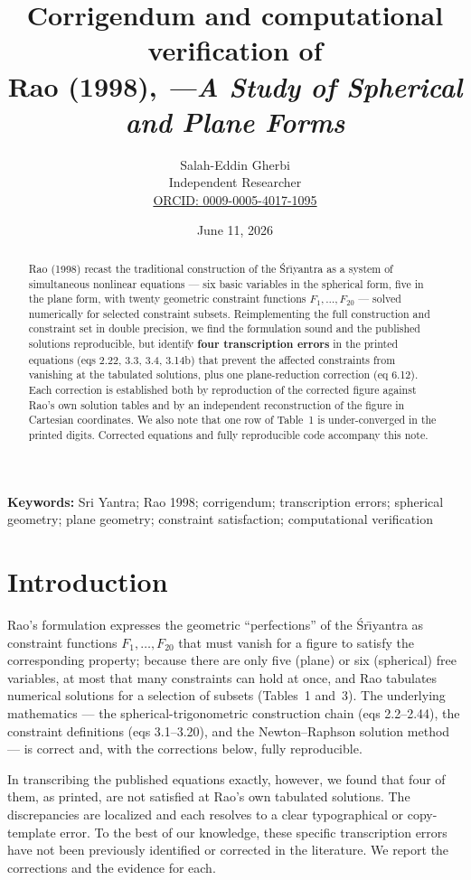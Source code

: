 \documentclass[11pt]{article}
\title{\vspace{-2em}Corrigendum and computational verification of\\
Rao (1998), \emph{\Sri{}---A Study of Spherical and Plane Forms}}
\author{Salah-Eddin Gherbi\\[2pt]\small Independent Researcher\\\small \href{https://orcid.org/0009-0005-4017-1095}{ORCID: 0009-0005-4017-1095}}
\date{June 11, 2026}
\newcommand{\Sri}{\'{S}r\={\i}yantra}
\providecommand{\keywords}[1]{\par\noindent\textbf{Keywords:} #1\par}
\begin{document}
\maketitle

\begin{abstract}
\noindent Rao (1998) recast the traditional construction of the \Sri{} as a system of simultaneous nonlinear equations --- six basic variables in the spherical form, five in the plane form, with twenty geometric constraint functions $F_1,\dots,F_{20}$ --- solved numerically for selected constraint subsets. Reimplementing the full construction and constraint set in double precision, we find the formulation sound and the published solutions reproducible, but identify \textbf{four transcription errors} in the printed equations (eqs 2.22, 3.3, 3.4, 3.14b) that prevent the affected constraints from vanishing at the tabulated solutions, plus one plane-reduction correction (eq 6.12). Each correction is established both by reproduction of the corrected figure against Rao's own solution tables and by an independent reconstruction of the figure in Cartesian coordinates. We also note that one row of Table~1 is under-converged in the printed digits. Corrected equations and fully reproducible code accompany this note.
\end{abstract}

\keywords{Sri Yantra; Rao 1998; corrigendum; transcription errors; spherical geometry; plane geometry; constraint satisfaction; computational verification}

\section{Introduction}
Rao's formulation expresses the geometric ``perfections'' of the \Sri{} as
constraint functions $F_1,\dots,F_{20}$ that must vanish for a figure to satisfy the corresponding property; because there are only five (plane) or six (spherical) free variables, at most that many constraints can hold at once, and Rao tabulates numerical solutions for a selection of subsets (Tables~1 and~3). The underlying mathematics --- the spherical-trigonometric construction chain (eqs 2.2--2.44), the constraint definitions (eqs 3.1--3.20), and the Newton--Raphson solution method --- is correct and, with the corrections below, fully reproducible.

In transcribing the published equations exactly, however, we found that four of them, as printed, are not satisfied at Rao's own tabulated solutions. The discrepancies are localized and each resolves to a clear typographical or copy-template error. To the best of our knowledge, these specific transcription errors have not been previously identified or corrected in the literature. We report the corrections and the evidence for each.
\end{document}
